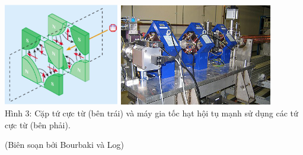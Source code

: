 \begin{center}
\hspace{0.05\textwidth}
\includegraphics[width=0.38\textwidth]{Problem_18/two_quadrapole.png}
\includegraphics[width=0.5\textwidth]{Problem_18/Synchrotron_Quadrupole.png} \\
    Hình 3: Cặp tứ cực từ (bên trái) và máy gia tốc hạt hội tụ mạnh sử dụng các tứ cực từ (bên phải).
\end{center}

\begin{flushright}
    (Biên soạn bởi Bourbaki và Log)
\end{flushright}